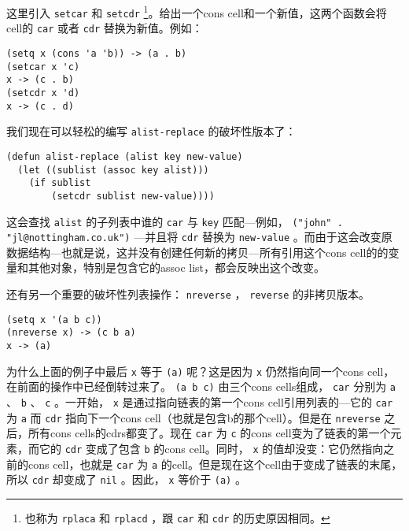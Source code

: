 这里引入 \texttt{setcar} 和 \texttt{setcdr} \footnote{也称为 \texttt{rplaca} 和 \texttt{rplacd} ，跟 \texttt{car} 和 \texttt{cdr} 的历史原因相同。}。给出一个cons cell和一个新值，这两个函数会将cell的 \texttt{car} 或者 \texttt{cdr} 替换为新值。例如：

\begin{verbatim}
(setq x (cons 'a 'b)) -> (a . b)
(setcar x 'c)
x -> (c . b)
(setcdr x 'd)
x -> (c . d)
\end{verbatim}

我们现在可以轻松的编写 \texttt{alist-replace} 的破坏性版本了：

\begin{verbatim}
(defun alist-replace (alist key new-value)
  (let ((sublist (assoc key alist)))
    (if sublist
        (setcdr sublist new-value))))
\end{verbatim}

这会查找 \texttt{alist} 的子列表中谁的 \texttt{car} 与 \texttt{key} 匹配---例如， \texttt{("john" . "jl@nottingham.co.uk")} ---并且将 \texttt{cdr} 替换为 \texttt{new-value} 。而由于这会改变原数据结构---也就是说，这并没有创建任何新的拷贝---所有引用这个cons cell的的变量和其他对象，特别是包含它的assoc list，都会反映出这个改变。

还有另一个重要的破坏性列表操作： \texttt{nreverse} ， \texttt{reverse} 的非拷贝版本。

\begin{verbatim}
(setq x '(a b c))
(nreverse x) -> (c b a)
x -> (a)
\end{verbatim}

为什么上面的例子中最后 \texttt{x} 等于 \texttt{(a)} 呢？这是因为 \texttt{x} 仍然指向同一个cons cell，在前面的操作中已经倒转过来了。 \texttt{(a b c)} 由三个cons cells组成， \texttt{car} 分别为 \texttt{a} 、 \texttt{b} 、 \texttt{c} 。一开始， \texttt{x} 是通过指向链表的第一个cons cell引用列表的---它的 \texttt{car} 为 \texttt{a} 而 \texttt{cdr} 指向下一个cons cell（也就是包含b的那个cell）。但是在 \texttt{nreverse} 之后，所有cons cells的cdrs都变了。现在 \texttt{car} 为 \texttt{c} 的cons cell变为了链表的第一个元素，而它的 \texttt{cdr} 变成了包含 \texttt{b} 的cons cell。同时， \texttt{x} 的值却没变：它仍然指向之前的cons cell，也就是 \texttt{car} 为 \texttt{a} 的cell。但是现在这个cell由于变成了链表的末尾，所以 \texttt{cdr} 却变成了 \texttt{nil} 。因此， \texttt{x} 等价于 \texttt{(a)} 。

